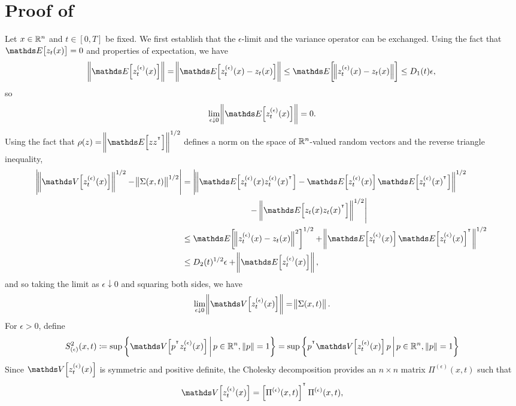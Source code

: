 \section{Proof of }\label{app:s2_calculation_proof}
Let \(x \in \mathbb{R}^n\) and \(t \in [0,T]\) be fixed.
We first establish that the \(\epsilon\)-limit and the variance operator can be exchanged.
Using the fact that \(\avg{z_t(x)} = 0\) and properties of expectation, we have
\[
	\norm{\avg{z_t^{(\epsilon)}(x)}} = \norm{\avg{z_t^{(\epsilon)}(x) - z_t(x)}} \leq \avg{\norm{z_t^{(\epsilon)}(x) - z_t(x)}} \leq D_1(t)\epsilon,
\]
so
\[
	\lim_{\epsilon\downarrow 0}\norm{\avg{z_t^{(\epsilon)}(x)}} = 0.
\]
Using the fact that \(\rho(z) = \norm{\avg{zz^{\T}}}^{1/2}\) defines a norm on the space of \(\mathbb{R}^n\)-valued random vectors and the reverse triangle inequality,
\begin{align*}
	\abs{\norm{\var{z_t^{(\epsilon)}(x)}}^{1/2} - \norm{\Sigma(x,t)}^{1/2}} & = \left|\norm{\avg{z_t^{(\epsilon)}(x)z_t^{(\epsilon)}(x)^{\T}} - \avg{z_t^{(\epsilon)}(x)}\avg{z_t^{(\epsilon)}(x)^{\T}}}^{1/2}\right. \\
	                                                                        & \qquad\qquad\qquad\qquad - \left.\norm{\avg{z_t(x) z_t(x)^{\T}}}^{1/2}\right|                                                           \\
	                                                                        & \leq \avg{\norm{z_t^{(\epsilon)}(x) - z_t(x)}^2}^{1/2} + \norm{\avg{z_t^{(\epsilon)}(x)}\avg{z_t^{(\epsilon)}(x)}^{\T}}^{1/2}           \\
	                                                                        & \leq D_2(t)^{1/2}\epsilon + \norm{\avg{z_t^{(\epsilon)}(x)}},
\end{align*}
and so taking the limit as \(\epsilon\downarrow 0\) and squaring both sides, we have
\begin{equation}
	\lim_{\epsilon\downarrow 0}\norm{\var{z_t^{(\epsilon)}(x)}} = \norm{\Sigma(x,t)}.
	\label{eqn:sigma_lim}
\end{equation}
For \(\epsilon > 0\), define
\[
	S^2_{(\epsilon)}(x,t) \coloneqq \sup{\setc{\var{p^{\T}z_t^{(\epsilon)}(x)}}{p \in \R^n, \, \norm{p} = 1}} = \sup{\setc{p^{\T}\var{z_t^{(\epsilon)}(x)}p}{p \in \R^n, \, \norm{p} = 1}}
\]
Since \(\var{z_t^{(\epsilon)}(x)}\) is symmetric and positive definite, the Cholesky decomposition provides an \(n \times n\) matrix \(\Pi^{(\epsilon)}\left(x,t\right)\) such that
\[
	\var{z_t^{(\epsilon)}(x)} = \left[\Pi^{(\epsilon)}(x,t)\right]^{\T}\Pi^{(\epsilon)}(x,t),
\]
